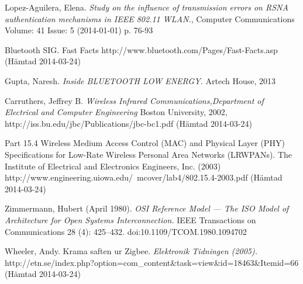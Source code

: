 \documentclass[a4paper,12pt,fleqn]{article}
\begin{document}
Lopez-Aguilera, Elena. \emph{Study on the influence of transmission errors on RSNA authentication mechanisms in IEEE 802.11 WLAN.}, Computer Communications Volume: 41 Issue: 5 (2014-01-01) p. 76-93

Bluetooth SIG. Fast Facts http://www.bluetooth.com/Pages/Fast-Facts.asp (Hämtad 2014-03-24)

Gupta, Naresh. \emph{Inside BLUETOOTH LOW ENERGY.} Artech House, 2013

Carruthers, Jeffrey B. \emph{Wireless Infrared Communications,Department of Electrical and Computer Engineering}
Boston University, 2002, http://iss.bu.edu/jbc/Publications/jbc-bc1.pdf (Hämtad 2014-03-24)

Part 15.4 Wireless Medium Access Control (MAC) and Physical Layer (PHY) Specifications for Low-Rate Wireless Personal Area Networks (LR\text{-}WPANs). The Institute of Electrical and Electronics Engineers, Inc. (2003) \\ http://www.engineering.uiowa.edu/~mcover/lab4/802.15.4-2003.pdf (Hämtad 2014-03-24)

Zimmermann, Hubert (April 1980).\emph{ OSI Reference Model — The ISO Model of Architecture for Open Systems Interconnection.} IEEE Transactions on Communications 28 (4): 425–432. doi:10.1109/TCOM.1980.1094702

Wheeler, Andy. Krama saften ur Zigbee. \emph{Elektronik Tidningen (2005).} \\ http://etn.se/index.php?option=com\_content\&task=view\&id=18463\&Itemid=66 (Hämtad 2014-03-24)
\end{document}
